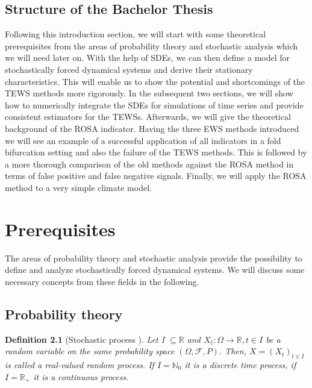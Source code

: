 \documentclass[%
thesis=student,%
coverpage=false,%
titlepage=false,%
headmarks=true, %
english,%
font=libertine, %
math=newpxtx, %
BCOR=5mm,%
coverBCOR=11mm%
]{tumbook}
\newtheorem{definition}{Definition}[section]
\begin{document}
\section{Structure of the Bachelor Thesis}
Following this introduction section, we will start with some theoretical prerequisites from the areas of probability theory and stochastic analysis which we will need later on. With the help of SDEs, we can then define a model for stochastically forced dynamical systems and derive their stationary characteristics. This will enable us to show the potential and shortcomings of the TEWS methods more rigorously. In the subsequent two sections, we will show how to numerically integrate the SDEs for simulations of time series and provide consistent estimators for the TEWSs. Afterwards, we will give the theoretical background of the ROSA indicator. Having the three EWS methods introduced we will see an example of a successful application of all indicators in a fold bifurcation setting and also the failure of the TEWS methods. This is followed by a more thorough comparison of the old methods against the ROSA method in terms of false positive and false negative signals. Finally, we will apply the ROSA method to a very simple climate model.





\chapter{Prerequisites}

The areas of probability theory and stochastic analysis provide the possibility to define and analyze stochastically forced dynamical systems. We will discuss some necessary concepts from these fields in the following.

\section{Probability theory}

\begin{definition}[Stochastic process \cite{rolles:2023}]
Let I $\subseteq \mathbb{R}$ and $X_{t}:\Omega \rightarrow \mathbb{R}, t \in I$ be a random variable on the same probability space $(\Omega,\mathcal{F},P)$. Then, $X = (X_{t})_{t \in I} $ is called a real-valued random process. If $I = \mathbb{N}_{0}$ it is a discrete time process, if  $I = \mathbb{R}_{+}$ it is a continuous process.
\end{definition}
\end{document}
